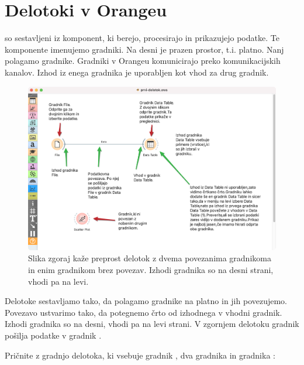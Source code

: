 \chapter{Delotoki v Orangeu}
\label{ch:workflows}

 so sestavljeni iz komponent, ki berejo, procesirajo in prikazujejo podatke. Te komponente imenujemo gradniki. Na desni je prazen prostor, t.i. platno. Nanj polagamo gradnike. Gradniki v Orangeu komunicirajo preko komunikacijskih kanalov. Izhod iz enega gradnika je uporabljen kot vhod za drug gradnik.

\begin{figure}[h]
  \includegraphics[width=\linewidth]{prvi-delotok.png}%
  \caption{Slika zgoraj kaže preprost delotok z dvema povezanima gradnikoma in enim gradnikom brez povezav. Izhodi gradnika so na desni strani, vhodi pa na levi.}
  \label{fig:workflow-fig1}
\end{figure}

Delotoke sestavljamo tako, da polagamo gradnike na platno in jih povezujemo. Povezavo ustvarimo tako, da potegnemo črto od izhodnega v vhodni gradnik. Izhodi gradnika so na desni, vhodi pa na levi strani. V zgornjem delotoku gradnik  pošilja podatke v gradnik .

\newpage

Pričnite z gradnjo delotoka, ki vsebuje gradnik , dva gradnika  in gradnika :

